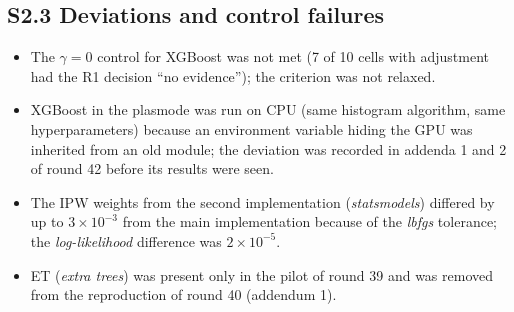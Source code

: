 \subsection*{S2.3 Deviations and control failures}
\begin{itemize}[leftmargin=1.2em,itemsep=0pt]
\item The $\gamma=0$ control for XGBoost was not met (7 of 10 cells with adjustment had the R1 decision ``no evidence''); the criterion was not relaxed.
\item XGBoost in the plasmode was run on CPU (same histogram algorithm, same hyperparameters) because an environment variable hiding the GPU was inherited from an old module; the deviation was recorded in addenda 1 and 2 of round 42 before its results were seen.
\item The IPW weights from the second implementation (\textit{statsmodels}) differed by up to $3\times10^{-3}$ from the main implementation because of the \textit{lbfgs} tolerance; the \textit{log-likelihood} difference was $2\times10^{-5}$.
\item ET (\textit{extra trees}) was present only in the pilot of round 39 and was removed from the reproduction of round 40 (addendum 1).
\end{itemize}


